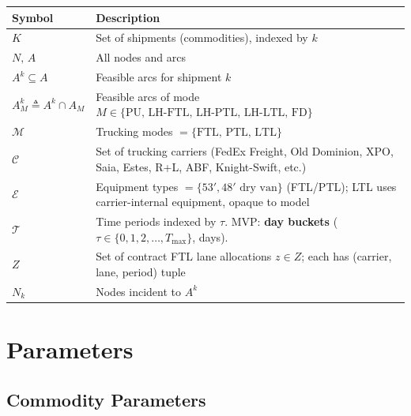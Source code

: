 \documentclass[11pt,a4paper]{article}
\newcommand{\defeq}{\triangleq}
\theoremstyle{definition}
\begin{document}
\begin{center}
\begin{tabular}{lp{11.5cm}}
\toprule
Symbol & Description \\
\midrule
$K$ & Set of shipments (commodities), indexed by $k$ \\
$N,\, A$ & All nodes and arcs \\
$A^k \subseteq A$ & Feasible arcs for shipment $k$ \\
$A^k_M \defeq A^k \cap A_M$ & Feasible arcs of mode $M \in \{\text{PU, LH-FTL, LH-PTL, LH-LTL, FD}\}$ \\
$\mathcal{M}$ & Trucking modes $= \{\text{FTL, PTL, LTL}\}$ \\
$\mathcal{C}$ & Set of trucking carriers (FedEx Freight, Old Dominion, XPO, Saia, Estes, R+L, ABF, Knight-Swift, etc.) \\
$\mathcal{E}$ & Equipment types $= \{53', 48'\text{ dry van}\}$ (FTL/PTL); LTL uses carrier-internal equipment, opaque to model \\
$\mathcal{T}$ & Time periods indexed by $\tau$. MVP: \textbf{day buckets} ($\tau \in \{0, 1, 2, \ldots, T_{\max}\}$, days). \\
$Z$ & Set of contract FTL lane allocations $z \in Z$; each has (carrier, lane, period) tuple \\
$N_k$ & Nodes incident to $A^k$ \\
\bottomrule
\end{tabular}
\end{center}

\section{Parameters}

\subsection{Commodity Parameters}
\end{document}
